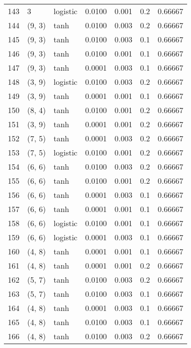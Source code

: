 \begin{tabular}{lllrrrr}
143 &           3 &  logistic &  0.0100 &  0.001 &  0.2 &   0.66667 \\
144 &      (9, 3) &      tanh &  0.0100 &  0.003 &  0.2 &   0.66667 \\
145 &      (9, 3) &      tanh &  0.0100 &  0.003 &  0.1 &   0.66667 \\
146 &      (9, 3) &      tanh &  0.0100 &  0.001 &  0.1 &   0.66667 \\
147 &      (9, 3) &      tanh &  0.0001 &  0.003 &  0.1 &   0.66667 \\
148 &      (3, 9) &  logistic &  0.0100 &  0.003 &  0.2 &   0.66667 \\
149 &      (3, 9) &      tanh &  0.0001 &  0.001 &  0.1 &   0.66667 \\
150 &      (8, 4) &      tanh &  0.0100 &  0.001 &  0.2 &   0.66667 \\
151 &      (3, 9) &      tanh &  0.0001 &  0.001 &  0.2 &   0.66667 \\
152 &      (7, 5) &      tanh &  0.0001 &  0.003 &  0.2 &   0.66667 \\
153 &      (7, 5) &  logistic &  0.0100 &  0.001 &  0.2 &   0.66667 \\
154 &      (6, 6) &      tanh &  0.0100 &  0.003 &  0.2 &   0.66667 \\
155 &      (6, 6) &      tanh &  0.0100 &  0.001 &  0.2 &   0.66667 \\
156 &      (6, 6) &      tanh &  0.0001 &  0.003 &  0.1 &   0.66667 \\
157 &      (6, 6) &      tanh &  0.0001 &  0.001 &  0.1 &   0.66667 \\
158 &      (6, 6) &  logistic &  0.0100 &  0.001 &  0.1 &   0.66667 \\
159 &      (6, 6) &  logistic &  0.0001 &  0.003 &  0.1 &   0.66667 \\
160 &      (4, 8) &      tanh &  0.0001 &  0.001 &  0.1 &   0.66667 \\
161 &      (4, 8) &      tanh &  0.0001 &  0.001 &  0.2 &   0.66667 \\
162 &      (5, 7) &      tanh &  0.0100 &  0.003 &  0.2 &   0.66667 \\
163 &      (5, 7) &      tanh &  0.0100 &  0.003 &  0.1 &   0.66667 \\
164 &      (4, 8) &      tanh &  0.0001 &  0.003 &  0.1 &   0.66667 \\
165 &      (4, 8) &      tanh &  0.0100 &  0.003 &  0.1 &   0.66667 \\
166 &      (4, 8) &      tanh &  0.0100 &  0.003 &  0.2 &   0.66667 \\

\end{tabular}
